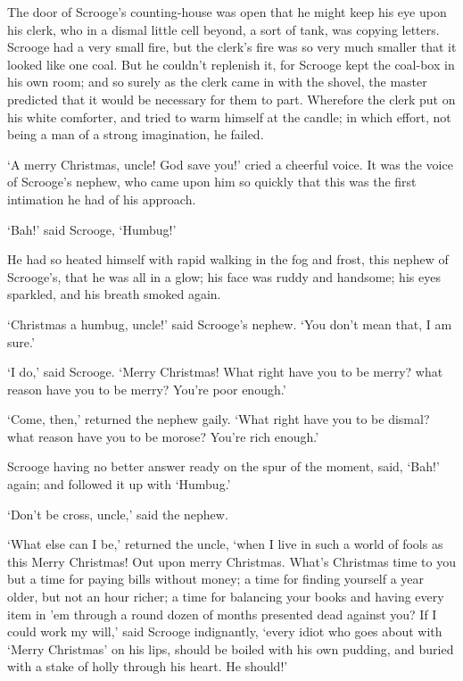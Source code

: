\documentclass[11pt,twoside]{article}\makeatletter
\begin{document}
The door of Scrooge's counting-house was open that he might keep his eye upon his clerk, who in a dismal little cell beyond, a sort of tank, was copying letters. Scrooge had a very small fire, but the clerk's fire was so very much smaller that it looked like one coal. But he couldn't replenish it, for Scrooge kept the coal-box in his own room; and so surely as the clerk came in with the shovel, the master predicted that it would be necessary for them to part. Wherefore the clerk put on his white comforter, and tried to warm himself at the candle; in which effort, not being a man of a strong imagination, he failed. \par
‘A merry Christmas, uncle! God save you!’ cried a cheerful voice. It was the voice of Scrooge's nephew, who came upon him so quickly that this was the first intimation he had of his approach. \par
‘Bah!’ said Scrooge, ‘Humbug!’\par
He had so heated himself with rapid walking in the fog and frost, this nephew of Scrooge's, that he was all in a glow; his face was ruddy and handsome; his eyes sparkled, and his breath smoked again. \par
‘Christmas a humbug, uncle!’ said Scrooge's nephew. ‘You don't mean that, I am sure.’\par
‘I do,’ said Scrooge. ‘Merry Christmas! What right have you to be merry? what reason have you to be merry? You're poor enough.’\par
‘Come, then,’ returned the nephew gaily. ‘What right have you to be dismal? what reason have you to be morose? You're rich enough.’\par
Scrooge having no better answer ready on the spur of the moment, said, ‘Bah!’ again; and followed it up with ‘Humbug.’\par
‘Don't be cross, uncle,’ said the nephew.\par
‘What else can I be,’ returned the uncle, ‘when I live in such a world of fools as this Merry Christmas! Out upon merry Christmas. What's Christmas time to you but a time for paying bills without money; a time for finding yourself a year older, but not an hour richer; a time for balancing your books and having every item in 'em through a round dozen of months presented dead against you? If I could work my will,’ said Scrooge indignantly, ‘every idiot who goes about with ‘Merry Christmas’ on his lips, should be boiled with his own pudding, and buried with a stake of holly through his heart. He should!’\par
\end{document}
